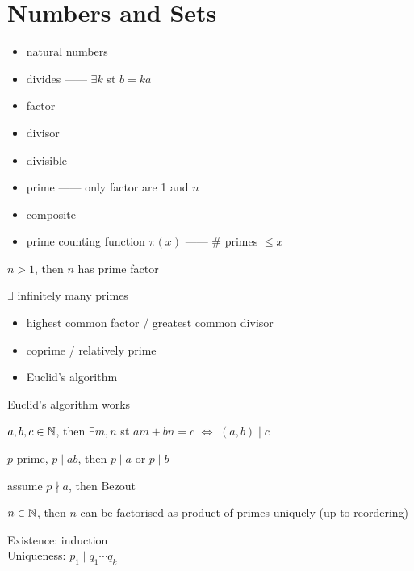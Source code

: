 \section{Numbers and Sets}\label{sec:numbers-and-sets}

\begin{itemize}
    \item natural numbers
    \item divides ------ $\exists k$ st $b = ka$
    \item factor
    \item divisor
    \item divisible
    \item prime ------ only factor are 1 and $n$
    \item composite
    \item prime counting function $\pi(x)$ ------ $\#$ primes $\leq x$
\end{itemize}

\begin{lemma}
    $n > 1$, then $n$ has prime factor
\end{lemma}

\begin{thm}
    $\exists$ infinitely many primes
\end{thm}

\begin{itemize}
    \item highest common factor / greatest common divisor
    \item coprime / relatively prime
    \item Euclid's algorithm
\end{itemize}

\begin{prop}
    Euclid's algorithm works
\end{prop}

\begin{thm}[Bezout]
    $a,b,c \in \mathbb{N}$, then $\exists m, n$ st $am + bn = c$ $\iff$ $(a,b) \mid c$
\end{thm}

\begin{prop}
    $p$ prime, $p \mid ab $, then $p \mid a$ or $p \mid b$
\end{prop}
\begin{pf}
    assume $p \nmid a$, then Bezout
\end{pf}

\begin{thm}
    $n \in \mathbb{N}$, then $n$ can be factorised as product of primes uniquely (up to reordering)
\end{thm}
\begin{pf}
    Existence: induction\\
    Uniqueness: $p_1 \mid q_1\cdots q_k$
\end{pf}

